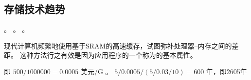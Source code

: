 {    \subsection{存储技术趋势}
    {
        。
        。
        。

        现代计算机频繁地使用基于SRAM的高速缓存，试图弥补处理器--内存之间的差距。
        这种方法行之有效是因为应用程序的一个称为的基本属性。

        \begin{practicec}
            即 $500 / 1000000 = 0.0005$ 美元/G 。
            $5 / 0.0005 / (5 / 0.03 / 10) = 600$ 年，即2605年
        \end{practicec}
    }
}
